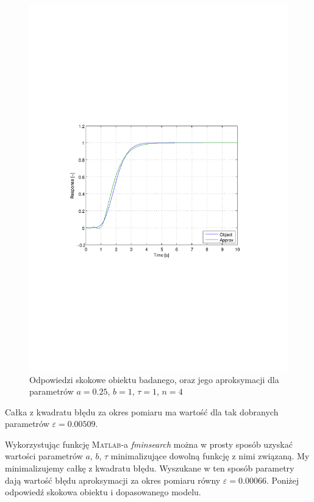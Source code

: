 \documentclass[12pt]{article}
\begin{document}
\begin{figure}[!htb]
	\begin{center}
		\includegraphics[width=14cm,trim=3cm 9cm 3cm 9cm,clip]
		{../res/img/modelfit_h.pdf} 
	\end{center}
	\caption{Odpowiedzi skokowe obiektu badanego, oraz jego aproksymacji dla
	parametrów $a=0.25$, $b=1$, $\tau=1$, $n=4$}
\end{figure}

Całka z kwadratu błędu za okres pomiaru ma wartość dla tak dobranych parametrów
$\varepsilon=0.00509$.

\newpage

Wykorzystując funkcję \textsc{Matlab}-a \textit{fminsearch} można w prosty
sposób uzyskać wartości parametrów $a$, $b$, $\tau$ minimalizujące dowolną
funkcję z nimi związaną. My minimalizujemy całkę z kwadratu błędu. Wyszukane w
ten sposób parametry dają wartość błędu aproksymacji za okres pomiaru równy
$\varepsilon=0.00066$. Poniżej odpowiedź skokowa obiektu i dopasowanego modelu.
\end{document}
